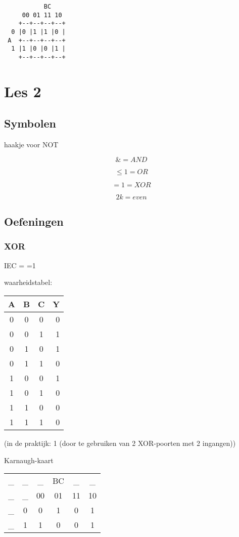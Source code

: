 \documentclass[11pt, a4paper]{article}
\begin{document}
\begin{verbatim}
    	   BC
     00 01 11 10
    +--+--+--+--+
  0 |0 |1 |1 |0 |
 A  +--+--+--+--+
  1 |1 |0 |0 |1 |
    +--+--+--+--+
\end{verbatim}


\newpage

\section{Les 2}

\subsection{Symbolen}

haakje voor NOT

$$\& = AND$$

$$\le1 = OR$$

$$=1 = XOR$$

$$2k = even$$

\subsection{Oefeningen}

\subsubsection{XOR}

IEC = =1

waarheidstabel:

\begin{tabular}{c c c || r}
A & B & C & Y \\
\hline
0 & 0 & 0 & 0 \\
0 & 0 & 1 & 1 \\
0 & 1 & 0 & 1 \\
0 & 1 & 1 & 0 \\
1 & 0 & 0 & 1 \\
1 & 0 & 1 & 0 \\
1 & 1 & 0 & 0 \\
1 & 1 & 1 & 0 \\
\end{tabular}

(in de praktijk: 1 (door te gebruiken van 2 XOR-poorten met 2 ingangen))

Karnaugh-kaart

\begin{tabular}{c c | c | c | c | c |}
  \_ & \_ & \_ & BC & \_ & \_\\
  \_ & \_ & 00 & 01 & 11 & 10 \\
   \hline
   \_ & 0 &  0 & 1 & 0 & 1 \\
   \hline
   \_ & 1 &  1 & 0 & 0 & 1 \\
   \hline
\end{tabular}
\end{document}
